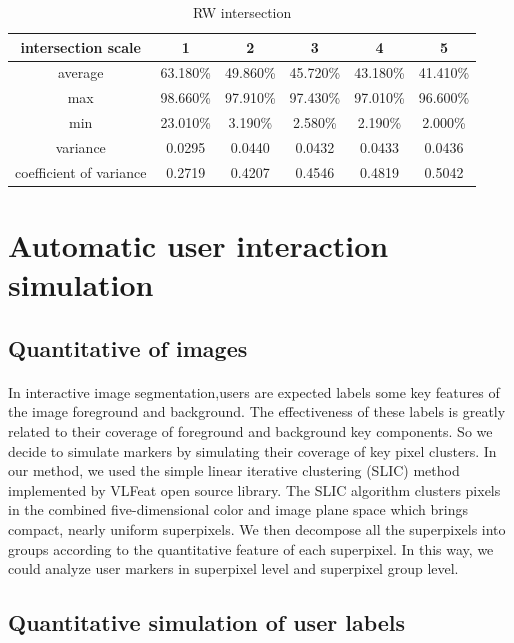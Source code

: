 \documentclass[runningheads,a4paper]{llncs}
\begin{document}
\begin{table}
\centering
\begin{tabular}{|c|c|c|c|c|c|}
\hline
intersection scale & 1 & 2 & 3 & 4& 5 \\
\hline
average& 63.180\% & 49.860\% & 45.720\% & 43.180\%& 41.410\% \\
\hline
max& 98.660\% & 97.910\% & 97.430\% & 97.010\%& 96.600\% \\
\hline
min& 23.010\% & 3.190\% & 2.580\% & 2.190\%& 2.000\%\\
\hline
variance& 0.0295 & 0.0440 & 0.0432 & 0.0433& 0.0436 \\
\hline
coefficient of variance& 0.2719 & 0.4207 & 0.4546 & 0.4819& 0.5042\\
\hline
\end{tabular}
\caption{RW intersection}
\label{ta:rw intersection}
\end{table} 



\section{Automatic user interaction simulation}
\subsection{Quantitative of images}
\paragraph{} In interactive image segmentation,users are expected labels some key features of the image foreground and background. The effectiveness of these labels is greatly related to their coverage of foreground and background key components. So we decide to simulate markers by simulating their coverage of key pixel clusters. In our method, we used the simple linear iterative clustering (SLIC)  method \citep{achanta2010slic} implemented by VLFeat open source library\citep{vedaldi08vlfeat}. The SLIC algorithm clusters pixels in the combined five-dimensional color and image plane space which brings compact, nearly uniform superpixels. We then decompose all the superpixels into groups according to the quantitative feature of each superpixel. In this way, we could analyze user markers in superpixel level and superpixel group level.

\subsection{Quantitative simulation of user labels}
\end{document}
